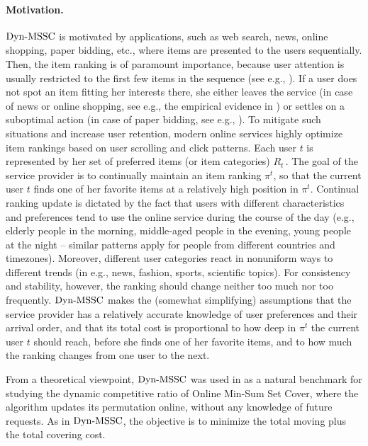 \paragraph{Motivation.} 
%
$\mathrm{Dyn}\text{-}\mathrm{MSSC}$ is motivated by applications, such as web search, news, online shopping, paper bidding, etc., where items are presented to the users sequentially. Then, the item ranking is of paramount importance, because user attention is usually restricted to the first few items in the sequence (see e.g., \cite{StreeterGK09,CKMS01,FSR18,PT18}). If a user does not spot an item fitting her interests there, she either leaves the service (in case of news or online shopping, see e.g., the empirical evidence in \cite{DGMM20}) or settles on a suboptimal action (in case of paper bidding, see e.g., \cite{GP13}). To mitigate such situations and increase user retention, modern online services highly optimize item rankings based on user scrolling and click patterns. Each user $t$ is represented by her set of preferred items (or item categories) $R_t$\,. The goal of the service provider is to continually maintain an item ranking $\pi^t$, so that the current user $t$ finds one of her favorite items at a relatively high position in $\pi^t$. Continual ranking update is dictated by the fact that users with different characteristics and preferences tend to use the online service during the course of the day (e.g., elderly people in the morning, middle-aged people in the evening, young people at the night -- similar patterns apply for people from different countries and timezones). Moreover, different user categories react in nonuniform ways to different trends (in e.g., news, fashion, sports, scientific topics). For consistency and stability, however, the ranking should change neither too much nor too frequently. $\mathrm{Dyn}\text{-}\mathrm{MSSC}$ makes the (somewhat simplifying) assumptions that the service provider has a relatively accurate knowledge of user preferences and their arrival order, and that its total cost is proportional to how deep in $\pi^t$ the current user $t$ should reach, before she finds one of her favorite items, and to how much the ranking changes from one user to the next. 

From a theoretical viewpoint, $\mathrm{Dyn}\text{-}\mathrm{MSSC}$ was used in \cite{FKKSV20} as a natural benchmark for studying the dynamic competitive ratio of Online Min-Sum Set Cover, where the algorithm updates its permutation online, without any knowledge of future requests. As in $\mathrm{Dyn}\text{-}\mathrm{MSSC}$, the objective is to minimize the total moving plus the total covering cost. 

